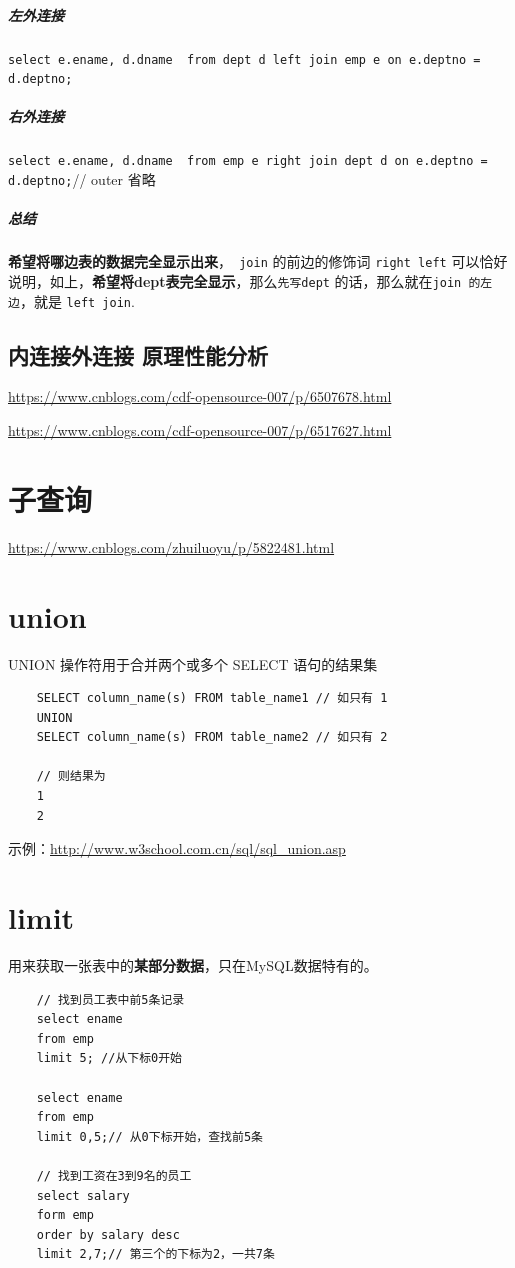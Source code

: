 \documentclass[UTF8,a4paper,12pt]{ctexbook}
\begin{document}
				
		\subparagraph{左外连接}
			\verb|select e.ename, d.dname  from dept d left join emp e on e.deptno = d.deptno;|
		
		\subparagraph{右外连接}
			\verb|select e.ename, d.dname  from emp e right join dept d on e.deptno = d.deptno;|// outer  省略
				
		
		\subparagraph{总结}
			\textbf{希望将哪边表的数据完全显示出来}，\verb| join| 的前边的修饰词 \verb|right left| 可以恰好说明，如上，\textbf{希望将dept表完全显示}，那么\verb|先写dept| 的话，那么就在\verb|join 的左边|，就是 \verb|left join|.	
			
	
	\subsection{内连接外连接 原理性能分析}
		\url{https://www.cnblogs.com/cdf-opensource-007/p/6507678.html}
		
		\url{https://www.cnblogs.com/cdf-opensource-007/p/6517627.html}
	
	\section{子查询}
		\url{https://www.cnblogs.com/zhuiluoyu/p/5822481.html}
	
	\section{union}
		UNION 操作符用于合并两个或多个 SELECT 语句的结果集
		
		\begin{lstlisting}
	SELECT column_name(s) FROM table_name1 // 如只有 1
	UNION
	SELECT column_name(s) FROM table_name2 // 如只有 2
	
	// 则结果为
	1
	2
		\end{lstlisting}	
		
		示例：\url{http://www.w3school.com.cn/sql/sql_union.asp}
			
	\section{limit}		
		用来获取一张表中的\textbf{某部分数据}，只在MySQL数据特有的。
		\begin{lstlisting}
	// 找到员工表中前5条记录
	select ename 
	from emp 
	limit 5; //从下标0开始
	
	select ename
	from emp
	limit 0,5;// 从0下标开始，查找前5条
	
	// 找到工资在3到9名的员工
	select salary 
	form emp
	order by salary desc 
	limit 2,7;// 第三个的下标为2，一共7条
		\end{lstlisting}
	
\end{document}
